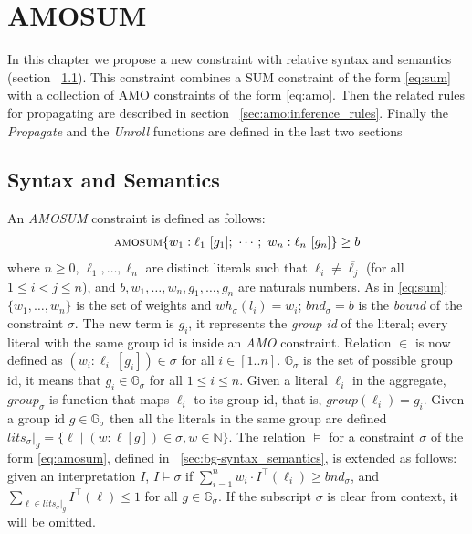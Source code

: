 \chapter{AMOSUM}
\label{cp:AMOSUM}
In this chapter we propose a new constraint with 
relative syntax and semantics (section ~\ref{sec:amo:syntax_semantics}).
This constraint combines a SUM constraint of the form  \eqref{eq:sum} 
with a collection of AMO constraints of the form \eqref{eq:amo}.
Then the related rules for propagating are described in section ~\ref{sec:amo:inference_rules}.
Finally the \textit{Propagate} and the \textit{Unroll} functions are defined 
in the last two sections

\section{Syntax and Semantics}
\label{sec:amo:syntax_semantics}
An \textit{AMOSUM} constraint is defined as follows:
\begin{align}\label{eq:amosum}
    \textsc{amosum}\{w_1 : \ell_1\ [g_1];\ \cdots;\ w_n : \ell_n\ [g_n]\} \geq b
\end{align} 
where $n \geq 0$, $\ell_1,\ldots,\ell_n$ are distinct literals such that $\ell_i \neq \overline{\ell_j}$ (for all $1 \leq i < j \leq n$),
and $b,w_1,\ldots,w_n,g_1,\ldots,g_n$ are naturals numbers. 
As in \eqref{eq:sum}: $\{w_1,\ldots,w_n\}$ is the set of weights and $\mathit{wh}_{\sigma}(l_i) = w_i$;
$\mathit{bnd}_{\sigma} = b$ is the \textit{bound} of the constraint $\sigma$.
The new term is $g_i$, it represents the \textit{group id} of the literal; every literal with the same 
group id is inside an \textit{AMO} constraint.
Relation ${}\in{}$ is now defined as $(w_i : \ell_i\ [g_i]) \in \sigma$ for all $i \in [1..n]$.
$\mathbb{G}_{\sigma}$ is the set of possible group id, it means that $g_i \in \mathbb{G}_{\sigma}$ for all $1 \leq i \leq n$.
Given a literal $\ell_i$ in the aggregate,  $\mathit{group}_{\sigma}$ is function that maps $\ell_i$ to its group id, that is, $\mathit{group}(\ell_i) = g_i$.
Given a group id $g \in \mathbb{G}_ {\sigma}$ then all the literals in the same group are 
defined $\mathit{lits}_{\sigma}|_g = \{ \ell \mid (w : \ell [g]) \in \sigma, w \in \mathbb{N}\}$.
The relation $\models$ for a constraint $\sigma$ of the form \eqref{eq:amosum}, defined in ~\ref{sec:bg-syntax_semantics}, is
extended as follows: given an interpretation $I$, $I \models \sigma$ if $\sum_{i = 1}^{n}{w_i \cdot I^{\top}(\ell_i)} \geq \mathit{bnd}_\sigma$,
and $\sum_{\ell \in \mathit{lits}_{\sigma}{|_g}}{I^{\top}(\ell)} \leq 1$ for all $g \in \mathbb{G}_\sigma$.
If the subscript $\sigma$ is clear from context, it will be omitted.

